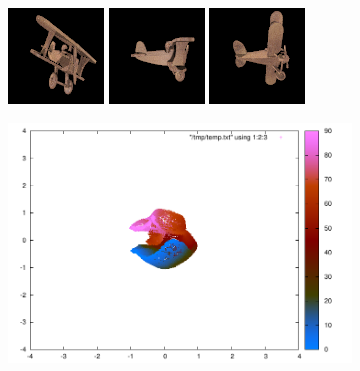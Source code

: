 \begin{figure}
\centering
\begin{subfigure}[b]{0.49 \textwidth}
\centering
\includegraphics[scale=0.5]{./figures/slow/toyplane.png} 
\includegraphics[scale=0.5]{./figures/slow/toyplane2.png} 
\includegraphics[scale=0.5]{./figures/slow/toyplane3.png}
        \caption{}
\label{fig:toyplane}
\end{subfigure}
%
\begin{subfigure}[b]{0.49 \textwidth}
\centering
\includegraphics[scale=0.5,trim = 120 100 130 70, clip]{./figures/slow/drlim1.pdf}

\end{subfigure}
\end{figure}
